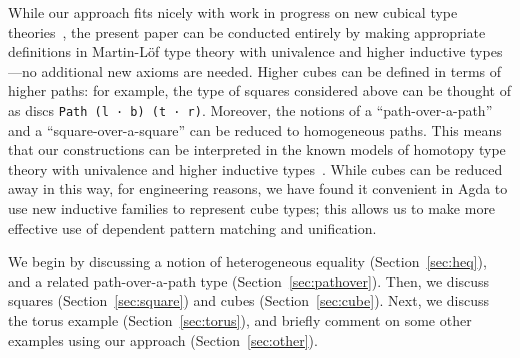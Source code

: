While our approach fits nicely with work in progress on new cubical type
theories~\citep{us,altenkirchkaposi14cubical,coquand14variations}, the
present paper can be conducted entirely by making appropriate
definitions in Martin-L\"of type theory with univalence and higher
inductive types---no additional new axioms are needed.  Higher cubes can
be defined in terms of higher paths: for example, the type of squares
considered above can be thought of as discs \verb|Path (l · b) (t · r)|.
Moreover, the notions of a ``path-over-a-path'' and a
``square-over-a-square'' can be reduced to homogeneous paths.  This
means that our constructions can be interpreted in the known models of
homotopy type theory with univalence and higher inductive
types~\cite{voevodsky+12simpluniv,shulman13inversediag,lumsdaine+13hits}.
While cubes can be reduced away in this way, for engineering reasons, we
have found it convenient in Agda to use new inductive families to
represent cube types; this allows us to make more effective use of
dependent pattern matching and unification.

We begin by discussing a notion of heterogeneous equality
(Section~\ref{sec:heq}), and a related path-over-a-path type
(Section~\ref{sec:pathover}).  Then, we discuss squares
(Section~\ref{sec:square}) and cubes (Section~\ref{sec:cube}).  Next, we
discuss the torus example (Section~\ref{sec:torus}), and briefly comment
on some other examples using our approach (Section~\ref{sec:other}).


